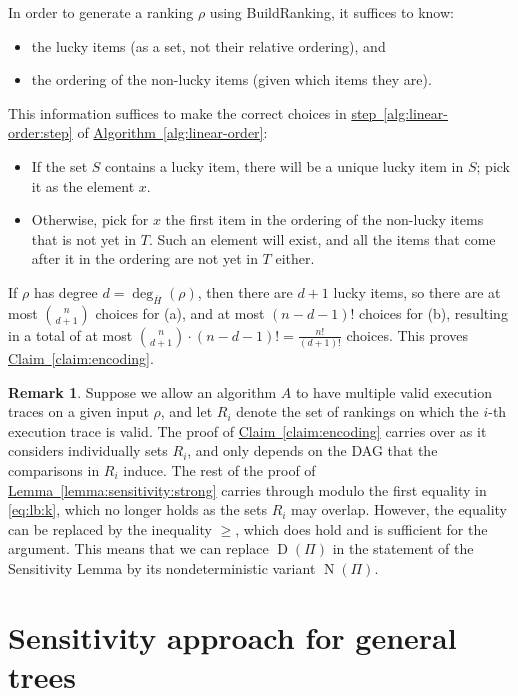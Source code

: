 \documentclass[11pt]{article}
\numberwithin{equation}{section}
\theoremstyle{definition}
\newtheorem{remark}[theorem]{Remark}
\theoremstyle{plain}
\newcommand{\expref}[2]{\hyperref[#2]{#1~\ref{#2}}}
\newcommand{\ranking}{\rho}
\DeclareMathOperator{\traces}{D}
\DeclareMathOperator{\NQ}{N}
\begin{document}
In order to generate a ranking $\ranking$ using BuildRanking, it suffices to know:
\begin{itemize}
\item[(a)] the lucky items (as a set, not their relative ordering), and 
\item[(b)] the ordering of the non-lucky items (given which items they are).
\end{itemize}
This information suffices to make the correct choices in \expref{step}{alg:linear-order:step} of \expref{Algorithm}{alg:linear-order}:
\begin{itemize}
\item 
If the set $S$ contains a lucky item, there will be a unique lucky item in  $S$; pick it as the element $x$.
\item 
Otherwise, pick for $x$ the first item in the ordering of the non-lucky items that is not yet in $T$. Such an element will exist, and all the items that come after it in the ordering are not yet in $T$ either.
\end{itemize}
If $\ranking$ has degree $d = \deg_{\overline{H}}(\ranking)$, then there are $d+1$ lucky items, so there are at most $\binom{n}{d+1}$ choices for (a), and at most $(n-d-1)!$ choices for (b), resulting in a total of at most $\binom{n}{d+1} \cdot (n-d-1)! = \frac{n!}{(d+1)!}$ choices. This proves \expref{Claim}{claim:encoding}.

\begin{remark}\label{remark:sensitivity}
Suppose we allow an algorithm $A$ to have multiple valid execution traces on a given input $\ranking$, and let $R_i$ denote the set of rankings on which the $i$-th execution trace is valid. The proof of \expref{Claim}{claim:encoding} carries over as it considers individually sets $R_i$, and only depends on the DAG that the comparisons in $R_i$ induce. The rest of the proof of \expref{Lemma}{lemma:sensitivity:strong} carries through modulo the first equality in \eqref{eq:lb:k}, which no longer holds as the sets $R_i$ may overlap. However, the equality can be replaced by the inequality $\ge$, which does hold and is sufficient for the argument. This means that we can replace $\traces(\Pi)$ in the statement of the Sensitivity Lemma by its nondeterministic variant $\NQ(\Pi)$.
\end{remark}



\section{Sensitivity approach for general trees}
\label{sec:sensitivity:general}
\end{document}
